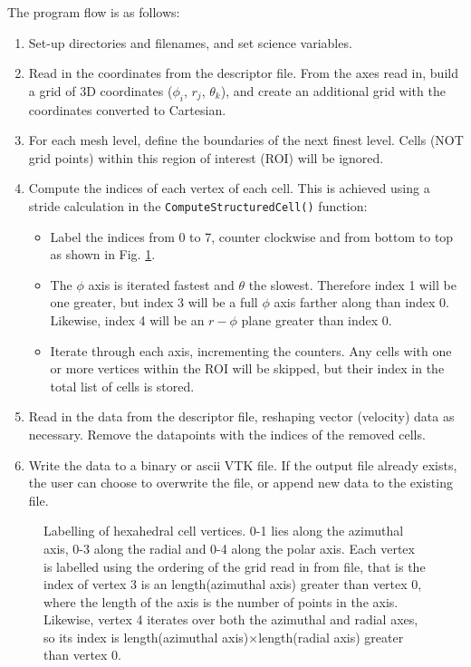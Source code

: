 \documentclass[preprint2]{aastex62}
\begin{document}
The program flow is as follows:
\begin{enumerate}
	\item Set-up directories and filenames, and set science variables.
	\item Read in the coordinates from the descriptor file. From the axes read in, build a grid of 3D coordinates ($\phi_{i}$, $r_{j}$, $\theta_{k}$), and create an additional grid with the coordinates converted to Cartesian. 
	\item For each mesh level, define the boundaries of the next finest level. Cells (NOT grid points) within this region of interest (ROI) will be ignored.
	\item Compute the indices of each vertex of each cell. This is achieved using a stride calculation in the \verb|ComputeStructuredCell()| function:	
	\begin{itemize}
		 \item Label the indices from 0 to 7, counter clockwise and from bottom to top as shown in Fig. \ref{fig:cube}.
		 \item The $\phi$ axis is iterated fastest and $\theta$ the slowest. Therefore index 1 will be one greater, but index 3 will be a full $\phi$ axis farther along than index 0. Likewise, index 4 will be an $r-\phi$ plane greater than index 0.
		 \item Iterate through each axis, incrementing the counters. Any cells with one or more vertices within the ROI will be skipped, but their index in the total list of cells is stored.
 	\end{itemize}
	\item Read in the data from the descriptor file, reshaping vector (velocity) data as necessary. Remove the datapoints with the indices of the removed cells.
	\item Write the data to a binary or ascii VTK file. If the output file already exists, the user can choose to overwrite the file, or append new data to the existing file.
\end{enumerate}
\begin{figure}[t]
	\centering
{}
\caption{\label{fig:cube} Labelling of hexahedral cell vertices. 0-1 lies along the azimuthal axis, 0-3 along the radial and 0-4 along the polar axis. Each vertex is labelled using the ordering of the grid read in from file, that is the index of vertex 3 is an length(azimuthal axis) greater than vertex 0, where the length of the axis is the number of points in the axis. Likewise, vertex 4 iterates over both the azimuthal and radial axes, so its index is length(azimuthal axis)$\times$length(radial axis) greater than vertex 0.}
\end{figure}
\end{document}
